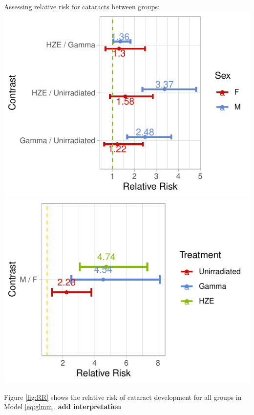 \documentclass[12pt]{article}
\begin{document}
Assessing relative risk for cataracts between groups:\\
\includegraphics{bookdown_report_files/figure-latex/RR-1.pdf} \includegraphics{bookdown_report_files/figure-latex/RR-2.pdf}

Figure \ref{fig:RR} shows the relative risk of cataract development for all groups in Model \eqref{eq:glmm}. \textbf{add interpretation}
\end{document}
